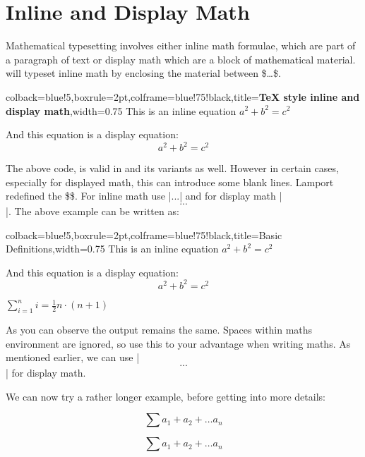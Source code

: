 \pagestyle{headings}

\section{Inline and Display Math}
Mathematical typesetting involves either inline math formulae, which are part of a paragraph of text or display math which are a block of mathematical material. \tex will typeset inline math by enclosing the material between  \$\ldots\$. 
\bigskip

\begin{tcblisting}{colback=blue!5,boxrule=2pt,colframe=blue!75!black,title=\textbf{TeX style inline and display math},width=0.75\textwidth}
This is an inline equation $a^2+b^2=c^2$

And this equation is a display equation:
$$a^2+b^2=c^2$$
\end{tcblisting}
\bigskip

The above code, is valid in \latex and its variants as well. However in certain cases, especially for displayed math, this can introduce some blank lines. Lamport redefined
the \$\$. For inline math use |\(...\)| and for display math |\[...\] |. The above example can be written as:
\bigskip

\begin{tcblisting}{colback=blue!5,boxrule=2pt,colframe=blue!75!black,title=Basic Definitions,width=0.75\textwidth}
This is an inline equation \(a^2+b^2=c^2\)

And this equation is a display equation:
\[a^2+b^2=c^2\]

\begin{math}
\sum_{i=1}^{n}i=\frac{1}{2}n\cdot(n+1)
\end{math}
\end{tcblisting}
\bigskip


As you can observe the output remains the same.  Spaces within  maths environment are ignored, so use this to your advantage when writing maths. As mentioned earlier, we can use |\[...\]| for display math.

We can now try a rather longer example, before getting into more details:
\begin{shaded}
\begin{teXXX}
\[ \sum a_1+a_2+\dots a_n \]
\end{teXXX}
\[ \sum a_1+a_2+\dots a_n \]
\end{shaded}


